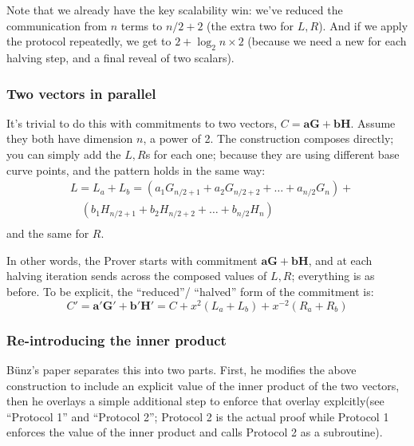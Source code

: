 \documentclass[10pt,a4paper]{article}
\begin{document}
Note that we already have the key scalability win: we've reduced the
communication from $n$ terms to $n/2 + 2$ (the extra two for $L, R$). And if we apply the
protocol repeatedly, we get to $2+\log_2 n \times 2$ (because we need a new for each halving
step, and a final reveal of two scalars).

\hypertarget{two-vectors-in-parallel}{%
\subsubsection[Two vectors in
parallel]{\texorpdfstring{\protect\hypertarget{anchor-50}{}{}Two vectors
in parallel}{Two vectors in parallel}}\label{two-vectors-in-parallel}}

It's trivial to do this with commitments to two vectors, $C = \textbf{aG} + \textbf{bH}$. Assume they
both have dimension $n$, a power of 2. The construction composes directly;
you can simply add the $L, R$s for each one; because they are using different
base curve points, and the pattern holds in the same way:
\begin{align*}
& L = L_a + L_b =  \left(a_1G_{n/2+1} + a_2G_{n/2+2}+\ldots+a_{n/2}G_{n}\right) + \\
& \quad \left(b_1H_{n/2+1} + b_2H_{n/2+2}+\ldots+b_{n/2}H_{n}\right) \\
\end{align*}
and the same for $R$.

In other words, the Prover starts with commitment $\mathbf{aG} + \mathbf{bH}$, and at each halving
iteration sends across the composed values of $L, R$; everything is as before.
To be explicit, the ``reduced''/ ``halved'' form of the commitment is:
\[C' = \textbf{a}'\textbf{G}' + \textbf{b}'\textbf{H}' = C + x^2 (L_a + L_b) + x^{-2}(R_a + R_b)\]

\hypertarget{re-introducing-the-inner-product}{%
\subsubsection[Re-introducing the inner
product]{\texorpdfstring{\protect\hypertarget{anchor-51}{}{}Re-introducing
the inner
product}{Re-introducing the inner product}}\label{re-introducing-the-inner-product}}

Bünz's paper separates this into two parts. First, he modifies the above
construction to include an explicit value of the inner product of the
two vectors, then he overlays a simple additional step to enforce that
overlay explcitly(see ``Protocol 1'' and ``Protocol 2''; Protocol 2 is
the actual proof while Protocol 1 enforces the value of the inner
product and calls Protocol 2 as a subroutine).
\end{document}
